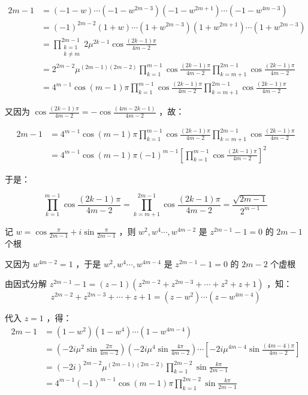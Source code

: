 \begin{equation}
\begin{aligned}
2m-1&=(-1-w)\cdots(-1-w^{2m-3})(-1-w^{2m+1})\cdots(-1-w^{4m-3})\\ &=(-1)^{2m-2}(1+w)\cdots(1+w^{2m-3})(1+w^{2m+1})\cdots(1+w^{2m-3})\\ &=\prod_{\substack{k=1\\k\neq m}}^{2m-1}2\mu^{2k-1}\cos\frac{(2k-1)\pi}{4m-2}\\ &=2^{2m-2}\mu^{(2m-1)(2m-2)}\prod_{k=1}^{m-1}\cos{\frac{(2k-1)\pi}{4m-2}}\prod_{k=m+1}^{2m-1}\cos{\frac{(2k-1)\pi}{4m-2}}\\ &=4^{m-1}\cos(m-1)\pi\prod_{k=1}^{m-1}\cos{\frac{(2k-1)\pi}{4m-2}}\prod_{k=m+1}^{2m-1}\cos{\frac{(2k-1)\pi}{4m-2}}
\end{aligned}
\end{equation}

又因为 $\displaystyle{\cos\frac{(2k-1)\pi}{4m-2}=-\cos\frac{(4m-2k-1)}{4m-2}}$ ，故：

\begin{equation}
\begin{aligned}
2m-1&=4^{m-1}\cos(m-1)\pi\prod_{k=1}^{m-1}\cos{\frac{(2k-1)\pi}{4m-2}}\prod_{k=m+1}^{2m-1}\cos{\frac{(2k-1)\pi}{4m-2}}\\ &=4^{m-1}\cos(m-1)\pi(-1)^{m-1}\left[\prod_{k=1}^{m-1}\cos{\frac{(2k-1)\pi}{4m-2}}\right]^2
\end{aligned}
\end{equation}

于是：

\begin{equation}%
\prod_{k=1}^{m-1}\cos{\frac{(2k-1)\pi}{4m-2}}=\prod_{k=m+1}^{2m-1}\cos{\frac{(2k-1)\pi}{4m-2}}=\frac{\sqrt{2m-1}}{2^{m-1}}
\end{equation}

记 $\displaystyle{w=\cos\frac{\pi}{2m-1}+i\sin\frac{\pi}{2m-1}}$ ，则 $w^2,w^4\cdots,w^{4m-2}$ 是 $z^{2m-1}-1=0$ 的 $2m-1$ 个根

又因为 $w^{4m-2}=1$ ，于是 $w^2,w^4\cdots ,w^{4m-4}$ 是 $z^{2m-1}-1=0$ 的 $2m-2$ 个虚根

由因式分解 $\displaystyle{z^{2m-1}-1=(z-1)(z^{2m-2}+z^{2m-3}+\cdots+z^{2}+z+1)}$ ，知：
$$z^{2m-2}+z^{2m-3}+\cdots+z+1=(z-w^2)\cdots(z-w^{4m-4})$$

代入 $z=1$ ，得：
$$\begin{eqnarray*} 2m-1&=(1-w^2)(1-w^4)\cdots(1-w^{4m-4})\\ &=\left(-2i\mu^2\sin\frac{2\pi}{4m-2}\right)\left(-2i\mu^4\sin\frac{4\pi}{4m-2}\right)\cdots\left[-2i\mu^{4m-4}\sin\frac{(4m-4)\pi}{4m-2}\right]\\ &=(-2i)^{2m-2}\mu^{(2m-1)(2m-2)}\prod_{k=1}^{2m-2}\sin\frac{k\pi}{2m-1}\\ &=4^{m-1}(-1)^{m-1}\cos(m-1)\pi\prod_{k=1}^{2m-2}\sin\frac{k\pi}{2m-1} \end{eqnarray*} $$

